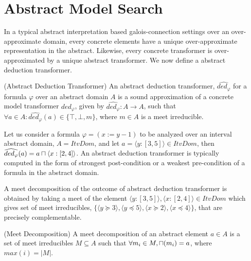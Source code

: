 \section{Abstract Model Search}
In a typical abstract interpretation based galois-connection settings over 
an over-approximate domain, every concrete elements have a unique over-approximate 
representation in the abstract.  Likewise, every concrete transformer is
over-approximated by a unique abstract transformer.  We now define a abstract 
deduction transformer.  

\begin{definition}{(Abstract Deduction Transformer)} An abstract deduction
transformer, $\widehat{ded_{\varphi}}$ for a formula $\varphi$ over an abstract 
domain $A$ is a sound approximation of a concrete model transformer
$ded_{\varphi}$, given by $\widehat{ded_{\varphi}} : A \rightarrow A$, such that 
$\forall a \in A: \widehat{ded_{\varphi}}(a) \in \{\top, \bot, m\}$, where 
$m \in A$ is a meet irreducible.   
\end{definition}

Let us consider a formula $\varphi = (x:=y-1)$ to be analyzed over 
an interval abstract domain, $A = ItvDom$, and let $a = \langle y:[3, 5]
\rangle \in ItvDom$, then $\widehat{ded_{\varphi}}(a) = a \sqcap \langle x:[2, 4]
\rangle$.  An abstract deduction transformer is typically computed in the form 
of strongest post-condition or a weakest pre-condition of a formula in the 
abstract domain.  

A meet decomposition of the outcome of abstract deduction transformer 
is obtained by taking a meet of the element $\langle y:[3, 5] \rangle, 
\langle x:[2, 4] \rangle \in ItvDom$ which gives set of meet irreducibles, 
$\{ \langle y \succeq 3 \rangle, \langle y \preceq 5 \rangle, 
\langle x \succeq 2 \rangle, \langle x \preceq 4 \rangle \}$, that are 
precisely complementable.

\begin{definition}{(Meet Decomposition)} A meet decomposition of an abstract
element $a \in A$ is a set of meet irreducibles $M \subseteq A$ such that 
$\forall m_i \in M, \sqcap(m_i) = a$, where $max(i) = |M|$.
\end{definition}
 
